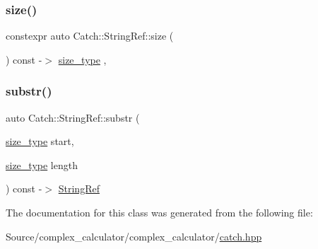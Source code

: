 \mbox{\label{class_catch_1_1_string_ref_acb22719801de2b64361b4c283080d4e5}} 
\subsubsection{\texorpdfstring{size()}{size()}}
{\footnotesize\ttfamily constexpr auto Catch\+::\+String\+Ref\+::size (\begin{DoxyParamCaption}{ }\end{DoxyParamCaption}) const -\/$>$ \mbox{\hyperlink{class_catch_1_1_string_ref_a06b4db8fc82b197004291cf370b2ba7c}{size\+\_\+type}} \hspace{0.3cm}{\ttfamily [inline]}, {\ttfamily [noexcept]}}

\mbox{\label{class_catch_1_1_string_ref_a594bc3e10ffad77df92f7d1a4c99d7ff}} 
\subsubsection{\texorpdfstring{substr()}{substr()}}
{\footnotesize\ttfamily auto Catch\+::\+String\+Ref\+::substr (\begin{DoxyParamCaption}\item[{\mbox{\hyperlink{class_catch_1_1_string_ref_a06b4db8fc82b197004291cf370b2ba7c}{size\+\_\+type}}}]{start,  }\item[{\mbox{\hyperlink{class_catch_1_1_string_ref_a06b4db8fc82b197004291cf370b2ba7c}{size\+\_\+type}}}]{length }\end{DoxyParamCaption}) const -\/$>$  \mbox{\hyperlink{class_catch_1_1_string_ref}{String\+Ref}}\hspace{0.3cm}{\ttfamily [noexcept]}}



The documentation for this class was generated from the following file\+:\begin{DoxyCompactItemize}
\item 
Source/complex\+\_\+calculator/complex\+\_\+calculator/\mbox{\hyperlink{catch_8hpp}{catch.\+hpp}}\end{DoxyCompactItemize}
